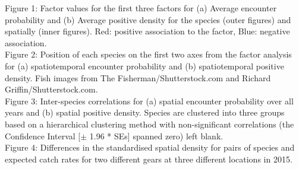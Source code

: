 \documentclass[fleqn,10pt]{wlscirep}
\begin{document}


\newpage

Figure 1: Factor values for the first three factors for (a) Average encounter
probability and (b) Average positive density for the species (outer figures)
and spatially (inner figures).  Red: positive association to the factor, Blue:
negative association.\\ 


Figure 2: Position of each species on the first two axes from the factor
analysis for (a) spatiotemporal encounter probability and (b) spatiotemporal
positive density. Fish images from The Fisherman/Shutterstock.com and Richard
Griffin/Shutterstock.com.\\
	
Figure 3: Inter-species correlations for (a) spatial encounter probability over
all years and (b) spatial positive density.  Species are clustered into three
groups based on a hierarchical clustering method with non-significant
correlations (the Confidence Interval [$\pm$ 1.96 * SEs] spanned zero) left
blank.\\

Figure 4: Differences in the standardised spatial density for pairs of species
and expected catch rates for two different gears at three different locations
in 2015.\\
\end{document}
